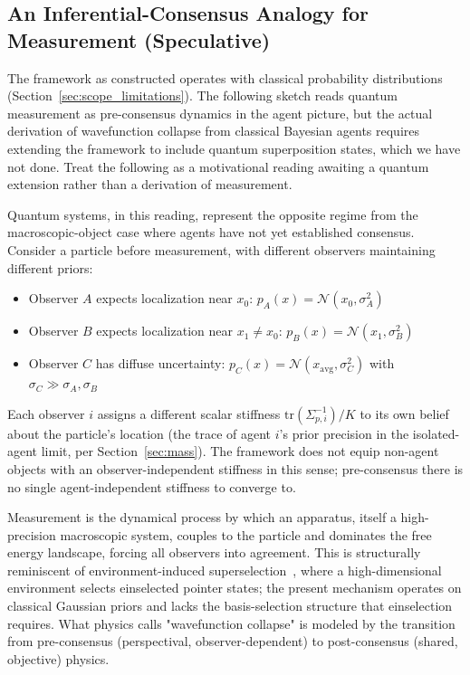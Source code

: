\documentclass[11pt]{article}
\begin{document}
\subsection{An Inferential-Consensus Analogy for Measurement (Speculative)}
\label{sec:measurement_analogy}

The framework as constructed operates with classical probability distributions (Section~\ref{sec:scope_limitations}). The following sketch reads quantum measurement as pre-consensus dynamics in the agent picture, but the actual derivation of wavefunction collapse from classical Bayesian agents requires extending the framework to include quantum superposition states, which we have not done. Treat the following as a motivational reading awaiting a quantum extension rather than a derivation of measurement.

Quantum systems, in this reading, represent the opposite regime from the macroscopic-object case where agents have not yet established consensus. Consider a particle before measurement, with different observers maintaining different priors:

\begin{itemize}
\item Observer $A$ expects localization near $x_0$:
      $p_A(x) = \mathcal{N}(x_0, \sigma_A^2)$
\item Observer $B$ expects localization near $x_1 \neq x_0$:
      $p_B(x) = \mathcal{N}(x_1, \sigma_B^2)$
\item Observer $C$ has diffuse uncertainty:
      $p_C(x) = \mathcal{N}(x_{\text{avg}}, \sigma_C^2)$ with $\sigma_C \gg \sigma_A, \sigma_B$
\end{itemize}

Each observer $i$ assigns a different scalar stiffness $\mathrm{tr}(\Sigma_{p,i}^{-1})/K$ to its own belief about the particle's location (the trace of agent $i$'s prior precision in the isolated-agent limit, per Section~\ref{sec:mass}). The framework does not equip non-agent objects with an observer-independent stiffness in this sense; pre-consensus there is no single agent-independent stiffness to converge to.

Measurement is the dynamical process by which an apparatus, itself a high-precision macroscopic system, couples to the particle and dominates the free energy landscape, forcing all observers into agreement. This is structurally reminiscent of environment-induced superselection~\cite{Zurek2003}, where a high-dimensional environment selects einselected pointer states; the present mechanism operates on classical Gaussian priors and lacks the basis-selection structure that einselection requires. What physics calls "wavefunction collapse" is modeled by the transition from pre-consensus (perspectival, observer-dependent) to post-consensus (shared, objective) physics.
\end{document}
